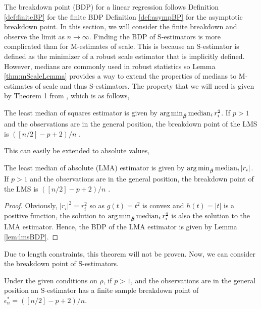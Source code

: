 The breakdown point (BDP) for a linear regression follows Definition \ref{def:finiteBP} for the finite BDP Definition \ref{def:asympBP} for the asymptotic breakdown point. In this section, we will consider the finite breakdown and observe the limit as $n \xrightarrow{} \infty$. Finding the BDP of S-estimators is more complicated than for M-estimates of scale. This is because an S-estimator is defined as the minimizer of a robust scale estimator that is implicitly defined. However, medians are commonly used in robust statistics so Lemma \ref{thm:mScaleLemma} provides a way to extend the properties of medians to M-estimates of scale and thus S-estimators. The property that we will need is given by Theorem 1 from \cite{rousseeuw1984least}, which is as follows,
\begin{lemma}
\label{lem:lmsBDP}
The least median of squares estimator is given by $\operatorname*{arg\,min}_{\hat{\bm{\beta}}} \operatorname*{median}_i r_i^2$. If $p>1$ and the observations are in the general position, the breakdown point of the LMS is $([n/2] - p + 2)/n$ \cite{rousseeuw1984least}.
\end{lemma}
This can easily be extended to absolute values,
\begin{lemma}
\label{lem:lmaBDP}
The least median of absolute (LMA) estimator is given by $\operatorname*{arg\,min}_{\hat{\bm{\beta}}} \operatorname*{median}_i |r_i|$. If $p>1$ and the observations are in the general position, the breakdown point of the LMS is $([n/2] - p + 2)/n$ \cite{rousseeuw1984least}.
\end{lemma}
\begin{proof}
Obviously, $|r_i|^2 = r_i^2$ so as $g(t) = t^2$ is convex and $h(t) = |t|$ is a positive function, the solution to $\operatorname*{arg\,min}_{\hat{\bm{\beta}}} \operatorname*{median}_i r_i^2$ is also the solution to the LMA estimator. Hence, the BDP of the LMA estimator is given by Lemma \ref{lem:lmsBDP}.
\end{proof}
\noindent Due to length constraints, this theorem will not be proven. Now, we can consider the breakdown point of S-estimators.
\begin{thm}
\label{thm:sBDP}
Under the given conditions on $\rho$, if $p>1$, and the observations are in the general position an S-estimator has a finite sample breakdown point of $\epsilon_n^* = ([n/2] - p + 2)/n$.
\end{thm}
